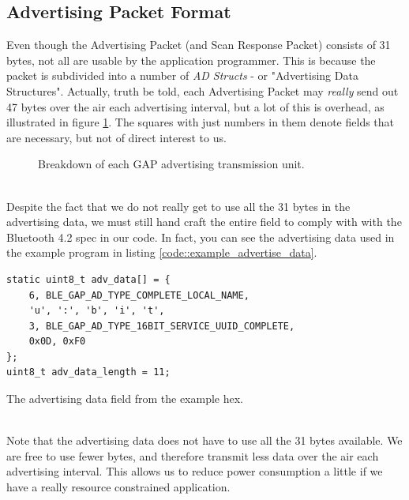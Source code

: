 \documentclass[11pt,a4paper]{article}
\begin{document}
\subsection{Advertising Packet Format}
Even though the Advertising Packet (and Scan Response Packet) consists of 31 bytes, not all are usable by the application programmer. This is because the packet is subdivided into a number of \textit{AD Structs} - or "Advertising Data Structures". Actually, truth be told, each Advertising Packet may \textit{really} send out 47 bytes over the air each advertising interval, but a lot of this is overhead, as illustrated in figure \ref{fig::pdu_breakdown}. The squares with just numbers in them denote fields that are necessary, but not of direct interest to us.\\
\begin{figure}[ht]
\centering

\caption{Breakdown of each GAP advertising transmission unit.}
\label{fig::pdu_breakdown}
\end{figure}\\
Despite the fact that we do not really get to use all the 31 bytes in the advertising data, we must still hand craft the entire field to comply with with the Bluetooth 4.2 spec in our code. In fact, you can see the advertising data used in the example program in listing \ref{code::example_advertise_data}.\\
\begin{listing}[hb]
\begin{verbatim}
static uint8_t adv_data[] = {
	6, BLE_GAP_AD_TYPE_COMPLETE_LOCAL_NAME,
	'u', ':', 'b', 'i', 't',
	3, BLE_GAP_AD_TYPE_16BIT_SERVICE_UUID_COMPLETE,
	0x0D, 0xF0
};
uint8_t adv_data_length = 11;
\end{verbatim}
\caption{The advertising data field from the example hex.}
\label{code::example_advertise_data}
\end{listing}\\
Note that the advertising data does not have to use all the 31 bytes available. We are free to use fewer bytes, and therefore transmit less data over the air each advertising interval. This allows us to reduce power consumption a little if we have a really resource constrained application.
\end{document}
